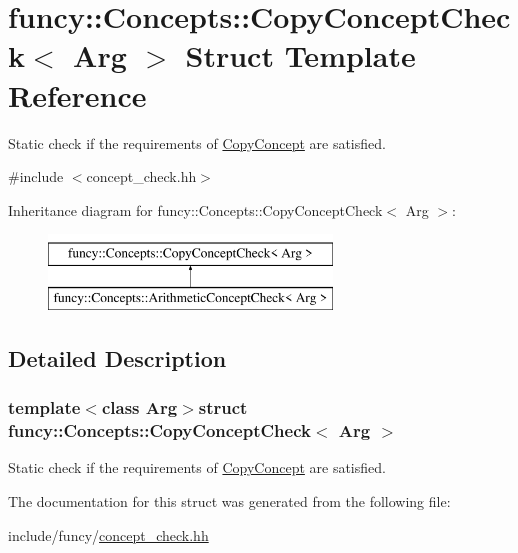 \hypertarget{structfuncy_1_1Concepts_1_1CopyConceptCheck}{\section{funcy\-:\-:Concepts\-:\-:Copy\-Concept\-Check$<$ Arg $>$ Struct Template Reference}
\label{structfuncy_1_1Concepts_1_1CopyConceptCheck}
}


Static check if the requirements of \hyperlink{structfuncy_1_1Concepts_1_1CopyConcept}{Copy\-Concept} are satisfied.  




{\ttfamily \#include $<$concept\-\_\-check.\-hh$>$}

Inheritance diagram for funcy\-:\-:Concepts\-:\-:Copy\-Concept\-Check$<$ Arg $>$\-:\begin{figure}[H]
\begin{center}
\leavevmode
\includegraphics[height=2.000000cm]{structfuncy_1_1Concepts_1_1CopyConceptCheck}
\end{center}
\end{figure}


\subsection{Detailed Description}
\subsubsection*{template$<$class Arg$>$struct funcy\-::\-Concepts\-::\-Copy\-Concept\-Check$<$ Arg $>$}

Static check if the requirements of \hyperlink{structfuncy_1_1Concepts_1_1CopyConcept}{Copy\-Concept} are satisfied. 

The documentation for this struct was generated from the following file\-:\begin{DoxyCompactItemize}
\item 
include/funcy/\hyperlink{concept__check_8hh}{concept\-\_\-check.\-hh}\end{DoxyCompactItemize}
